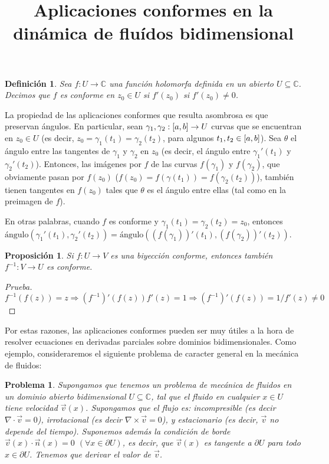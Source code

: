 \documentclass{article}
\title{Aplicaciones conformes en la dinámica de fluídos bidimensional}
\newcommand{\complexNumbers}{\mathbb{C}}
\newcommand{\leftOpenInterval}{\left]}
\newcommand{\rightOpenInterval}{\right[}
\newcommand{\leftClosedInterval}{\left[}
\newcommand{\rightClosedInterval}{\right]}
\newcommand{\interval}[3]{%
    \ifstrequal{#1}{oo}{%
      \leftOpenInterval #2, #3 \rightOpenInterval%
    }{%
      \ifstrequal{#1}{co}{%
        \leftClosedInterval #2, #3 \rightOpenInterval%
      }{%
        \ifstrequal{#1}{oc}{
          \leftOpenInterval #2, #3 \rightClosedInterval%
        }{%
          \ifstrequal{#1}{cc}{
            \leftClosedInterval #2, #3 \rightClosedInterval
          }{%
          }%
        }%
      }%
    }%
  }
\newtheorem{proposition}{Proposición}
\newtheorem{problem}{Problema}
\newtheorem{definition}{Definición}
\begin{document}
  \maketitle
  \begin{definition}
    Sea \(f : U \rightarrow \complexNumbers\) una función holomorfa definida en un abierto \(U \subseteq \complexNumbers\).
    Decimos que \(f\) es conforme en \(z_0 \in U\) si \(f'(z_0)\) si \(f'(z_0) \neq 0\).
  \end{definition}

  La propiedad de las aplicaciones conformes que resulta asombrosa es que preservan ángulos.
  En particular, sean \(\gamma_1, \gamma_2 : \interval{cc}{a}{b} \rightarrow U\) curvas que se encuentran en \(z_0 \in U\) (es decir, \(z_0 = \gamma_1(t_1) = \gamma_2(t_2)\), para algunos \(t_1, t_2 \in \interval{cc}{a}{b}\)).
  Sea \(\theta\) el ángulo entre las tangentes de \(\gamma_1\) y \(\gamma_2\) en \(z_0\) (es decir, el ángulo entre \(\gamma_1'(t_1)\) y \(\gamma_2'(t_2)\)).
  Entonces, las imágenes por \(f\) de las curvas \(f(\gamma_1)\) y \(f(\gamma_2)\), que obviamente pasan por \(f(z_0)\) (\(f(z_0) = f(\gamma(t_1)) = f(\gamma_2(t_2))\)), también tienen tangentes en \(f(z_0)\) tales que \(\theta\) es el ángulo entre ellas (tal como en la preimagen de \(f\)).
  
  En otras palabras, cuando \(f\) es conforme y \(\gamma_1(t_1) = \gamma_2(t_2) = z_0\), entonces \(\text{ángulo}(\gamma_1'(t_1), \gamma_2'(t_2)) = \text{ángulo}((f(\gamma_1))'(t_1), (f(\gamma_2))'(t_2))\).

  \begin{proposition}
    Si \(f: U \rightarrow V\) es una biyección conforme, entonces también \(f^{-1} : V \rightarrow U\) es conforme.
  \end{proposition}
  \begin{proof}[Prueba]
    \({f^{-1} (f (z)) = z} \Rightarrow {(f^{- 1})'(f(z)) f'(z) = 1} \Rightarrow {(f^{-1})'(f(z)) = 1 / f'(z) \neq 0}\)
  \end{proof}

  Por estas razones, las aplicaciones conformes pueden ser muy útiles a la hora de resolver ecuaciones en derivadas parciales sobre dominios bidimensionales.
  Como ejemplo, consideraremos el siguiente problema de caracter general en la mecánica de fluidos:

  \begin{problem}
    Supongamos que tenemos un problema de mecánica de fluidos en un dominio abierto bidimensional \(U \subseteq \complexNumbers\), tal que el fluido en cualquier \(x \in U\) tiene velocidad \(\vec{v}(x)\).
    Supongamos que el flujo es:
    incompresible (es decir \(\nabla \cdot \vec{v} = 0\)), irrotacional (es decir \(\nabla \times \vec{v} = 0\)), y estacionario (es decir, \(\vec{v}\) no depende del tiempo).
    Suponemos además la condición de borde \(\vec{v}(x) \cdot \vec{n}(x) = 0\) \((\forall x \in \partial U)\), es decir, que \(\vec{v}(x)\) es tangente a \(\partial U\) para todo \(x \in \partial U\).
    Tenemos que derivar el valor de \(\vec{v}\).
  \end{problem}
\end{document}
